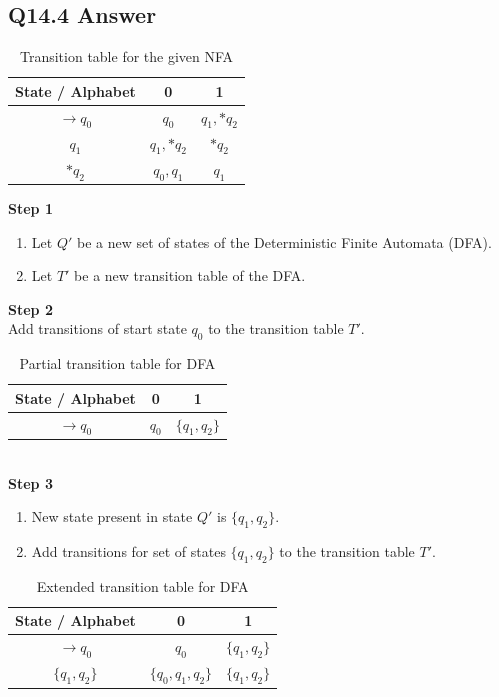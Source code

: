 \documentclass{article}
\begin{document}
\subsection*{Q14.4 Answer}
\begin{table}[h]
\centering
\begin{tabular}{c|c|c}
State / Alphabet & 0 & 1 \\ \hline
$\rightarrow q_0$ & $q_0$ & $q_1, *q_2$ \\
$q_1$ & $q_1, *q_2$ & $*q_2$ \\
$*q_2$ & $q_0, q_1$ & $q_1$ \\
\end{tabular}
\caption{Transition table for the given NFA}
\end{table}
\textbf{Step 1}
\begin{enumerate}
\item Let $Q'$ be a new set of states of the Deterministic Finite Automata (DFA).
\item Let $T'$ be a new transition table of the DFA.
\end{enumerate}
\textbf{Step 2}
\\ Add transitions of start state $q_0$ to the transition table $T'$.
\begin{table}[h]
\centering
\begin{tabular}{c|c|c}
State / Alphabet & 0 & 1 \\ \hline
$\rightarrow q_0$ & $q_0$ & $\{q_1, q_2\}$ \\
\end{tabular}
\caption{Partial transition table for DFA}
\end{table}
\\ \textbf{Step 3}
\begin{enumerate}
\item New state present in state $Q'$ is $\{q_1, q_2\}$.
\item Add transitions for set of states $\{q_1, q_2\}$ to the transition table $T'$.
\end{enumerate}
\begin{table}[h]
\centering
\begin{tabular}{c|c|c}
State / Alphabet & 0 & 1 \\ \hline
$\rightarrow q_0$ & $q_0$ & $\{q_1, q_2\}$ \\
$\{q_1, q_2\}$ & $\{q_0, q_1, q_2\}$ & $\{q_1, q_2\}$ \\
\end{tabular}
\caption{Extended transition table for DFA}
\end{table}
\end{document}
